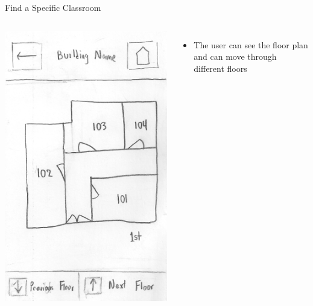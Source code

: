 \documentclass{beamer}
\begin{document}
\begin{frame}{Find a Specific Classroom}
    \begin{columns}[c]
        \center\includegraphics[height=0.75 \textheight]{hand-drawn/floorplan.png}
        \begin{itemize}
            \item The user can see the floor plan and can move through different floors
        \end{itemize}
    \end{columns}
\end{frame}
\end{document}
